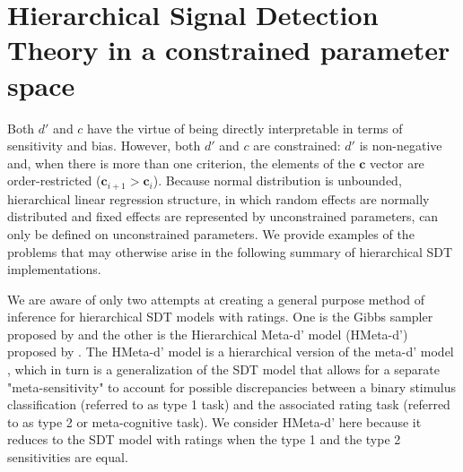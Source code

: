\documentclass[oneside,a4paper]{article}
\begin{document}
\section{Hierarchical Signal Detection Theory in a constrained
  parameter space}

Both $d'$ and $c$ have the virtue of being directly interpretable in
terms of sensitivity and bias. However, both $d'$ and $c$ are
constrained: $d'$ is non-negative and, when there is more than one
criterion, the elements of the $\bm{c}$ vector are order-restricted
($\bm{c}_{i+1} > \bm{c}_i$). Because normal distribution is unbounded,
hierarchical linear regression structure, in which random effects are
normally distributed and fixed effects are represented by
unconstrained parameters, can only be defined on unconstrained
parameters. We provide examples of the problems that may otherwise
arise in the following summary of hierarchical SDT implementations.

We are aware of only two attempts at creating a general purpose method
of inference for hierarchical SDT models with ratings. One is the
Gibbs sampler proposed by  and the other
is the Hierarchical Meta-d' model (HMeta-d') proposed by
.
The HMeta-d' model is a hierarchical version of the meta-d' model
\cite{maniscalco2012signal}, which in turn is a generalization of the
SDT model that allows for a separate "meta-sensitivity" to account for
possible discrepancies
between a binary stimulus classification (referred to as type 1 task)
and the associated rating task (referred to as type 2 or
meta-cognitive task). We consider HMeta-d' here because it reduces to
the SDT model with
ratings when the type 1 and the type 2 sensitivities are equal.
\end{document}
